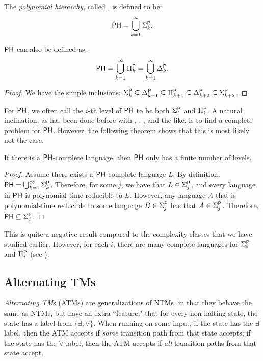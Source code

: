 \begin{definition}
The \emph{polynomial hierarchy}, called \PH, is defined to be:
\[
\PH = \bigcup_{k = 1}^{\infty} \Sigma_k^\P.
\]
\end{definition}

\begin{theorem}
$\PH$ can also be defined as:
\[
\PH = \bigcup_{k = 1}^{\infty} \Pi_k^\P = \bigcup_{k = 1}^{\infty} \Delta_k^\P.
\]
\end{theorem}

\begin{proof}
We have the simple inclusions: $\Sigma_k^\P \subseteq \Delta_{k+1}^\P \subseteq \Pi_{k+1}^\P \subseteq \Delta_{k+2}^\P \subseteq \Sigma_{k+2}^\P$.
\end{proof}

For $\PH$, we often call the $i$-th level of $\PH$ to be both $\Sigma_i^\P$ and $\Pi_i^\P$. A natural inclination, as has been done before with \NP, \PSPACE, \NL, and the like, is to find a complete problem for $\PH$. However, the following theorem shows that this is most likely not the case.

\begin{theorem}
If there is a $\PH$-complete language, then $\PH$ only has a finite number of levels.
\end{theorem}

\begin{proof}
Assume there exists a $\PH$-complete language $L$. By definition, $\PH = \bigcup_{k = 1}^{\infty} \Sigma_k^\P$. Therefore, for some $j$, we have that $L \in \Sigma_j^\P$, and every language in $\PH$ is polynomial-time reducible to $L$. However, any language $A$ that is polynomial-time reducible to some language $B \in \Sigma_j^\P$ has that $A \in \Sigma_j^\P$. Therefore, $\PH \subseteq \Sigma_j^\P$.
\end{proof}

This is quite a negative result compared to the complexity classes that we have studied earlier. However, for each $i$, there are many complete languages for $\Sigma_i^\P$ and $\Pi_i^\P$ (see \cite{Schaefer_completenessin}).

\subsection{Alternating TMs}
\begin{definition}
\emph{Alternating TM}s (ATMs) are generalizations of NTMs, in that they behave the same as NTMs, but have an extra ``feature," that for every non-halting state, the state has a label from $\{\exists, \forall\}$. When running on some input, if the state has the $\exists$ label, then the ATM accepts if \emph{some} transition path from that state accepts; if the state has the $\forall$ label, then the ATM accepts if \emph{all} transition paths from that state accept.
\end{definition}